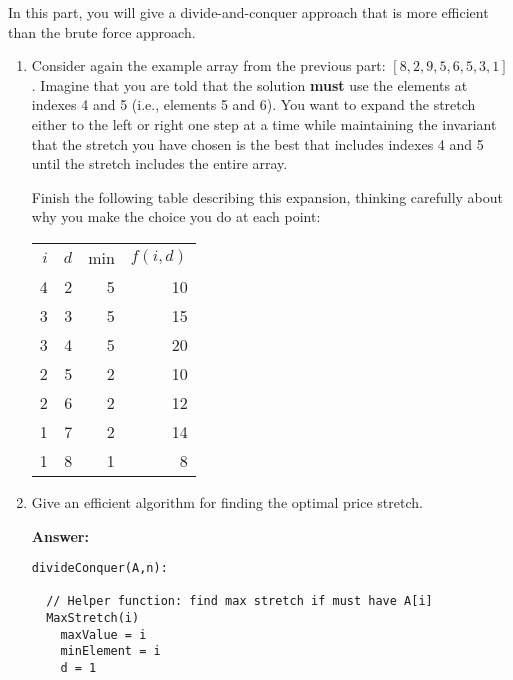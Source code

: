 \documentclass[11pt, oneside]{article}   	%
\theoremstyle{definition}
\theoremstyle{remark}
\begin{document}
In this part, you will give a divide-and-conquer approach that is more
efficient than the brute force approach.
\begin{enumerate}
\item Consider again the example array from the previous part: $[8, 2, 9,
   5, 6, 5, 3, 1]$. Imagine that you are told that the solution \textbf{must}
   use the elements at indexes 4 and 5 (i.e., elements 5 and 6). You
   want to expand the stretch either to the left or right one step at
   a time while maintaining the invariant that the stretch you have
   chosen is the best that includes indexes 4 and 5 until the stretch
   includes the entire array.
   
   Finish the following table describing this expansion, thinking
   carefully about why you make the choice you do at each point:

\begin{center}
\begin{tabular}{rrrr}
    $i$  &     $d$  &    min &    $f(i,d)$  \\
      4  &       2  &        5  &        10  \\
      3  &       3  &        5  &        15  \\
      3  &       4  &        5  &        20  \\
 	  2  &       5  &        2  &        10  \\
 	  2  &		6  &			2 &		   12 \\
 	  1  & 		7  &			2 & 			14\\
      1  &       8  &        1  &         8  \\
\end{tabular}
\end{center}


\item Give an efficient algorithm for finding the optimal price stretch.

\textbf{Answer: } 

\begin{verbatim}
divideConquer(A,n):

  // Helper function: find max stretch if must have A[i]  
  MaxStretch(i)
    maxValue = i
    minElement = i
    d = 1
    

\end{verbatim}
\end{enumerate}
\end{document}
